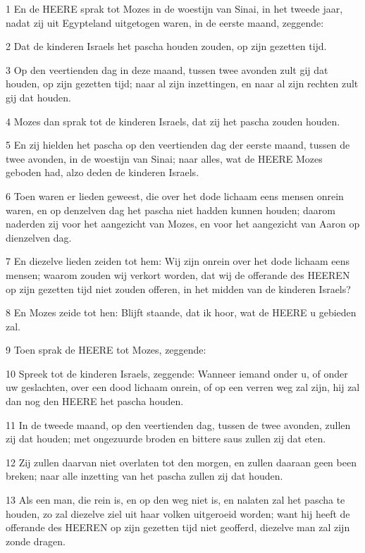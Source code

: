 \par 1 En de HEERE sprak tot Mozes in de woestijn van Sinai, in het tweede jaar, nadat zij uit Egypteland uitgetogen waren, in de eerste maand, zeggende:
\par 2 Dat de kinderen Israels het pascha houden zouden, op zijn gezetten tijd.
\par 3 Op den veertienden dag in deze maand, tussen twee avonden zult gij dat houden, op zijn gezetten tijd; naar al zijn inzettingen, en naar al zijn rechten zult gij dat houden.
\par 4 Mozes dan sprak tot de kinderen Israels, dat zij het pascha zouden houden.
\par 5 En zij hielden het pascha op den veertienden dag der eerste maand, tussen de twee avonden, in de woestijn van Sinai; naar alles, wat de HEERE Mozes geboden had, alzo deden de kinderen Israels.
\par 6 Toen waren er lieden geweest, die over het dode lichaam eens mensen onrein waren, en op denzelven dag het pascha niet hadden kunnen houden; daarom naderden zij voor het aangezicht van Mozes, en voor het aangezicht van Aaron op dienzelven dag.
\par 7 En diezelve lieden zeiden tot hem: Wij zijn onrein over het dode lichaam eens mensen; waarom zouden wij verkort worden, dat wij de offerande des HEEREN op zijn gezetten tijd niet zouden offeren, in het midden van de kinderen Israels?
\par 8 En Mozes zeide tot hen: Blijft staande, dat ik hoor, wat de HEERE u gebieden zal.
\par 9 Toen sprak de HEERE tot Mozes, zeggende:
\par 10 Spreek tot de kinderen Israels, zeggende: Wanneer iemand onder u, of onder uw geslachten, over een dood lichaam onrein, of op een verren weg zal zijn, hij zal dan nog den HEERE het pascha houden.
\par 11 In de tweede maand, op den veertienden dag, tussen de twee avonden, zullen zij dat houden; met ongezuurde broden en bittere saus zullen zij dat eten.
\par 12 Zij zullen daarvan niet overlaten tot den morgen, en zullen daaraan geen been breken; naar alle inzetting van het pascha zullen zij dat houden.
\par 13 Als een man, die rein is, en op den weg niet is, en nalaten zal het pascha te houden, zo zal diezelve ziel uit haar volken uitgeroeid worden; want hij heeft de offerande des HEEREN op zijn gezetten tijd niet geofferd, diezelve man zal zijn zonde dragen.
